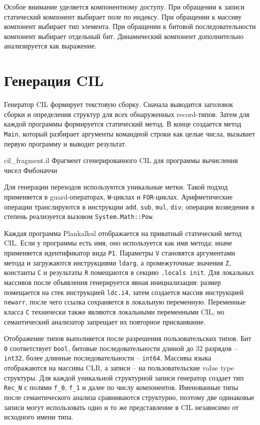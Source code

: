 Особое внимание уделяется компонентному доступу.
При обращении к записи статический компонент выбирает поле по индексу.
При обращении к массиву компонент выбирает тип элемента.
При обращении к битовой последовательности компонент выбирает отдельный бит.
Динамический компонент дополнительно анализируется как выражение.

\section{Генерация CIL}
Генератор CIL формирует текстовую сборку.
Сначала выводится заголовок сборки и определения структур для всех обнаруженных record-типов.
Затем для каждой программы формируется статический метод.
В конце создается метод \texttt{Main}, который разбирает аргументы командной строки как целые числа, вызывает первую программу и выводит результат.

{cil_fragment.il}
{Фрагмент сгенерированного CIL для программы вычисления чисел Фибоначчи}

Для генерации переходов используются уникальные метки.
Такой подход применяется в guard-операторах, \texttt{W}-циклах и \texttt{FOR}-циклах.
Арифметические операции транслируются в инструкции \texttt{add}, \texttt{sub}, \texttt{mul}, \texttt{div}; операция возведения в степень реализуется вызовом \texttt{System.Math::Pow}.

Каждая программа Plankalkul отображается на приватный статический метод CIL.
Если у программы есть имя, оно используется как имя метода; иначе применяется идентификатор вида \texttt{P1}.
Параметры \texttt{V} становятся аргументами метода и загружаются инструкциями \texttt{ldarg}, а промежуточные значения \texttt{Z}, константы \texttt{C} и результаты \texttt{R} помещаются в секцию \texttt{.locals init}.
Для локальных массивов после объявления генерируется явная инициализация: размер помещается на стек инструкцией \texttt{ldc.i4}, затем создается массив инструкцией \texttt{newarr}, после чего ссылка сохраняется в локальную переменную.
Переменные класса \texttt{C} технически также являются локальными переменными CIL, но семантический анализатор запрещает их повторное присваивание.

Отображение типов выполняется после разрешения пользовательских типов.
Бит \texttt{0} соответствует \texttt{bool}, битовые последовательности длиной до 32 разрядов -- \texttt{int32}, более длинные последовательности -- \texttt{int64}.
Массивы языка отображаются на массивы CLR, а записи -- на пользовательские value type структуры.
Для каждой уникальной структурной записи генератор создает тип \texttt{Rec\_N} с полями \texttt{f\_0}, \texttt{f\_1} и далее по числу компонентов.
Именованные типы после семантического анализа сравниваются структурно, поэтому две одинаковые записи могут использовать одно и то же представление в CIL независимо от исходного имени типа.

